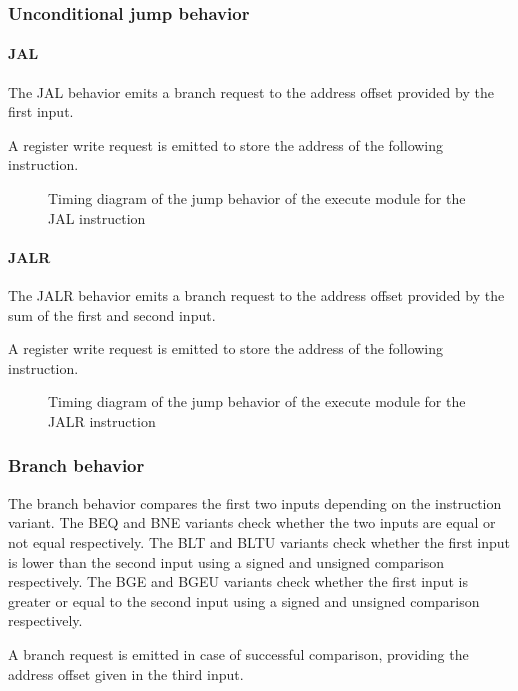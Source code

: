     \subsubsection{Unconditional jump behavior}

      \paragraph{JAL}

      \begin{content}
          The JAL behavior emits a branch request to the address offset provided by the first input.
          
          A register write request is emitted to store the address of the following instruction.
        \end{content}

      \begin{figure}[H]
          \centering
          
          \caption{Timing diagram of the jump behavior of the execute module for the JAL instruction}
          \label{fig:exm-behavior-jump-jal}
        \end{figure}

      \paragraph{JALR}

      \begin{content}
          The JALR behavior emits a branch request to the address offset provided by the sum of the first and second input.
          
          A register write request is emitted to store the address of the following instruction.
        \end{content}

      \begin{figure}[H]
          \centering
          
          \caption{Timing diagram of the jump behavior of the execute module for the JALR instruction}
          \label{fig:exm-behavior-jump-jalr}
        \end{figure}

    \subsubsection{Branch behavior}

      \begin{content}
          The branch behavior compares the first two inputs depending on the instruction variant. The BEQ and BNE variants check whether the two inputs are equal or not equal respectively. The BLT and BLTU variants check whether the first input is lower than the second input using a signed and unsigned comparison respectively. The BGE and BGEU variants check whether the first input is greater or equal to the second input using a signed and unsigned comparison respectively.
          
          A branch request is emitted in case of successful comparison, providing the address offset given in the third input.
        \end{content}

